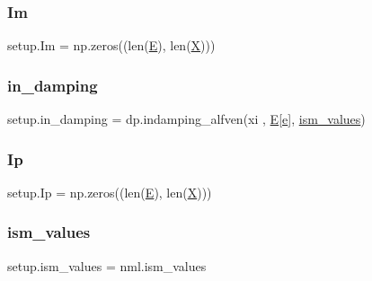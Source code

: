 \subsubsection{\texorpdfstring{Im}{Im}}
{\footnotesize\ttfamily setup.\+Im = np.\+zeros((len(\hyperlink{namespacesetup_a8bf3113e27e2925ec3309507c6d5ebf2}{E}), len(\hyperlink{namespacesetup_a0d71901ea06bb31a1b5e9e742158486f}{X})))}

\mbox{\label{namespacesetup_ac628de529060bc52e17cbc026eab73fa}} 
\subsubsection{\texorpdfstring{in\+\_\+damping}{in\_damping}}
{\footnotesize\ttfamily setup.\+in\+\_\+damping = dp.\+indamping\+\_\+alfven(xi , \hyperlink{namespacesetup_a8bf3113e27e2925ec3309507c6d5ebf2}{E}\mbox{[}\hyperlink{constants_8h_a2b076531cd50c7b55702a53221f2ac72}{e}\mbox{]}, \hyperlink{namespacesetup_ae9743eacdcbd49599d43d5f99093a3d7}{ism\+\_\+values})}

\mbox{\label{namespacesetup_a1b1fb53552cd03979e26847c91f252ac}} 
\subsubsection{\texorpdfstring{Ip}{Ip}}
{\footnotesize\ttfamily setup.\+Ip = np.\+zeros((len(\hyperlink{namespacesetup_a8bf3113e27e2925ec3309507c6d5ebf2}{E}), len(\hyperlink{namespacesetup_a0d71901ea06bb31a1b5e9e742158486f}{X})))}

\mbox{\label{namespacesetup_ae9743eacdcbd49599d43d5f99093a3d7}} 
\subsubsection{\texorpdfstring{ism\+\_\+values}{ism\_values}}
{\footnotesize\ttfamily setup.\+ism\+\_\+values = nml.\+ism\+\_\+values}

\mbox{\label{namespacesetup_a7bc6df070fdda049feea9b88ee5a558f}} 
